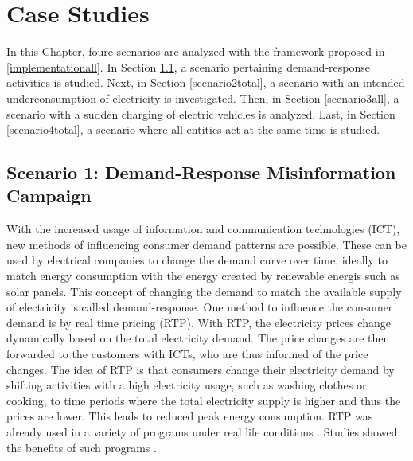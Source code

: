 \chapter{Case Studies}
\label{results}

In this Chapter, foure scenarios are analyzed with the framework 
proposed in \ref{implementationall}.
In Section \ref{demandresponsesection}, a scenario
pertaining demand-response activities is studied.
Next, in Section \ref{scenario2total}, a scenario
with an intended underconsumption of electricity is 
investigated. Then, in Section \ref{scenario3all},
a scenario with a sudden charging of electric vehicles
is analyzed.
Last, in Section \ref{scenario4total}, a scenario
where all entities act at the same time is studied.


\section{Scenario 1: Demand-Response Misinformation Campaign}
\label{demandresponsesection}

With the increased usage of information and communication 
technologies (ICT), new methods of influencing
consumer demand patterns are possible. 
These can be used by electrical companies to change the 
demand curve over time, ideally to match energy consumption
with the energy created by renewable energis such 
as solar panels. 
This concept of changing the demand to match the 
available supply of electricity is called demand-response. 
One method to influence the consumer demand is by real time 
pricing (RTP). With RTP, the electricity prices change
dynamically based on the total electricity demand.
The price changes are then forwarded to the customers with ICTs, 
who are thus informed of the price changes.
The idea of RTP is that consumers change their electricity demand
by shifting activities with a high electricity usage, 
such as washing clothes or cooking, to time periods 
where the total electricity supply is higher and thus the prices
are lower. This leads to reduced peak energy consumption. 
RTP was already used in a variety of programs
under real life conditions \cite{barbose2004survey}.
Studies showed the benefits of such programs \cite{albadi2008summary}.

